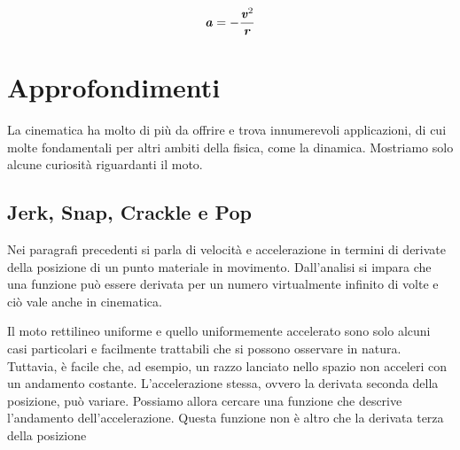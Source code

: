\begin{align}
    \textbf{\textit{a}} = -\frac{\textbf{\textit{v}}^2}{\textbf{\textit{r}}}
\end{align}




\section{Approfondimenti}
La cinematica ha molto di più da offrire e trova innumerevoli applicazioni,
di cui molte fondamentali per altri ambiti della fisica, come la dinamica.
Mostriamo solo alcune curiosità riguardanti il moto.

\subsection{Jerk, Snap, Crackle e Pop}
Nei paragrafi precedenti si parla di velocità e accelerazione in termini
di derivate della posizione di un punto materiale in movimento. Dall'analisi
si impara che una funzione può essere derivata per un numero virtualmente
infinito di volte e ciò vale anche in cinematica.


Il moto rettilineo uniforme e quello uniformemente accelerato sono solo
alcuni casi particolari e facilmente trattabili che si possono osservare
in natura. Tuttavia, è facile che, ad esempio, un razzo lanciato nello
spazio non acceleri con un andamento costante. L'accelerazione stessa,
ovvero la derivata seconda della posizione, può variare. Possiamo allora
cercare una funzione che descrive l'andamento dell'accelerazione. Questa funzione
non è altro che la derivata terza della posizione

